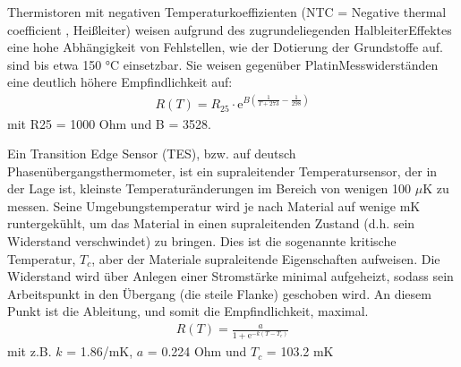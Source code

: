 \documentclass[letterpaper,10pt,english]{jupyterBook}
\begin{document}
\sphinxAtStartPar
Thermistoren mit negativen Temperaturkoeffizienten (NTC = Negative thermal coefficient , Heißleiter) weisen aufgrund des zugrundeliegenden Halbleiter\sphinxhyphen{}Effektes eine hohe Abhängigkeit von Fehlstellen, wie der Dotierung der Grundstoffe auf.
 sind bis etwa 150 °C einsetzbar.
Sie weisen gegenüber Platin\sphinxhyphen{}Messwiderständen eine deutlich höhere Empfindlichkeit auf:
\begin{equation*}
\begin{split} R(T)=R_{25} \cdot \mathrm e^{B\left(\frac{1}{T+273}-\frac{1}{298}\right)}\end{split}
\end{equation*}
\sphinxAtStartPar
mit R25 = 1000 Ohm und B = 3528.

\sphinxAtStartPar
Ein Transition Edge Sensor (TES), bzw. auf deutsch Phasenübergangsthermometer, ist ein supraleitender Temperatursensor, der in der Lage ist, kleinste Temperaturänderungen im Bereich von wenigen 100 \(\mu\mathrm K\) zu messen. Seine Umgebungstemperatur wird je nach Material auf wenige mK runtergekühlt, um das Material in einen supraleitenden Zustand (d.h. sein Widerstand verschwindet) zu bringen. Dies ist die sogenannte kritische Temperatur, \(T_c\), aber der Materiale supraleitende Eigenschaften aufweisen. Die Widerstand wird über Anlegen einer Stromstärke minimal aufgeheizt, sodass sein Arbeitspunkt in den Übergang (die steile Flanke) geschoben wird. An diesem Punkt ist die Ableitung, und somit die Empfindlichkeit, maximal.
\begin{equation*}
\begin{split} R(T)= \frac{a}{1 + \mathrm e^{-k(T-T_c)}} \end{split}
\end{equation*}
\sphinxAtStartPar
mit z.B. \(k\) = 1.86/mK, \(a\) = 0.224 Ohm und \(T_c\) = 103.2 mK

\sphinxAtStartPar
{}
\end{document}
